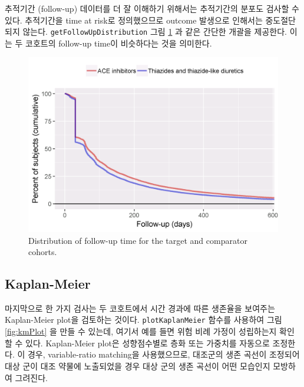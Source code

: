 \documentclass[11pt]{book}
\theoremstyle{definition}
\theoremstyle{definition}
\theoremstyle{definition}
\theoremstyle{remark}
\begin{document}
추적기간 (follow-up) 데이터를 더 잘 이해하기 위해서는 추적기간의 분포도
검사할 수 있다. 추적기간을 time at risk로 정의했으므로 outcome 발생으로
인해서는 중도절단되지 않는다. \texttt{getFollowUpDistribution} 그림
\ref{fig:followUp} 과 같은 간단한 개괄을 제공한다. 이는 두 코호트의
follow-up time이 비슷하다는 것을 의미한다.

\begin{figure}

{\centering \includegraphics[width=0.8\linewidth]{images/PopulationLevelEstimation/followUp} 

}

\caption{Distribution of follow-up time for the target and comparator cohorts.}\label{fig:followUp}
\end{figure}

\subsection{Kaplan-Meier}\label{kaplan-meier}

마지막으로 한 가지 검사는 두 코호트에서 시간 경과에 따른 생존율을
보여주는 Kaplan-Meier plot을 검토하는 것이다. \texttt{plotKaplanMeier}
함수를 사용하여 그림 \ref{fig:kmPlot} 을 만들 수 있는데, 여기서 예를
들면 위험 비례 가정이 성립하는지 확인할 수 있다. Kaplan-Meier plot은
성향점수별로 층화 또는 가중치를 자동으로 조정한다. 이 경우,
variable-ratio matching을 사용했으므로, 대조군의 생존 곡선이 조정되어
대상 군이 대조 약물에 노출되었을 경우 대상 군의 생존 곡선이 어떤
모습인지 모방하여 그려진다. 
\end{document}
